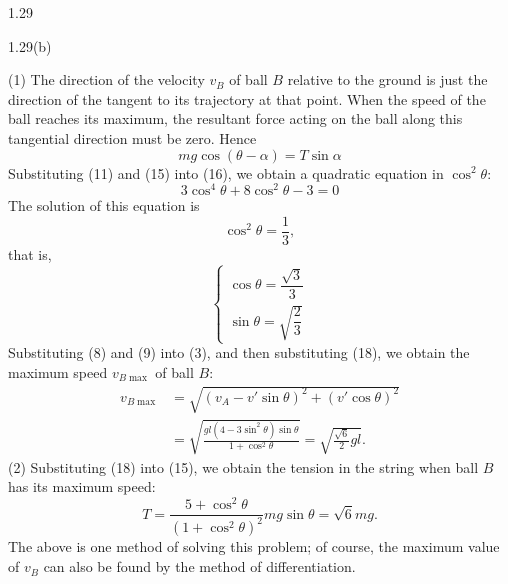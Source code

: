 \begin{solution}{1.29}
\begin{figbox}{1.29(b)}
\end{figbox}

(1) The direction of the velocity $v_B$ of ball $B$ relative to the ground is just the direction of the tangent to its trajectory at that point. When the speed of the ball reaches its maximum, the resultant force acting on the ball along this tangential direction must be zero. Hence
\begin{equation}
mg\cos(\theta-\alpha)=T\sin\alpha \tag{16}
\end{equation}
Substituting (11) and (15) into (16), we obtain a quadratic equation in $\cos^2\theta$:
\begin{equation}
3\cos^4\theta+8\cos^2\theta-3=0 \tag{17}
\end{equation}
The solution of this equation is
\[
\cos^2\theta=\frac{1}{3},
\]
that is,
\begin{equation}
\begin{cases}
\cos\theta=\dfrac{\sqrt{3}}{3}\\[2ex]
\sin\theta=\sqrt{\dfrac{2}{3}}
\end{cases} \tag{18}
\end{equation}
Substituting (8) and (9) into (3), and then substituting (18), we obtain the maximum speed $v_{B\max}$ of ball $B$:
\begin{align*}
v_{B\max}&=\sqrt{(v_A-v'\sin\theta)^2+(v'\cos\theta)^2}\\
&=\sqrt{\frac{gl(4-3\sin^2\theta)\sin\theta}{1+\cos^2\theta}}=\sqrt{\frac{\sqrt{6}}{2}gl}.
\end{align*}
(2) Substituting (18) into (15), we obtain the tension in the string when ball $B$ has its maximum speed:
\[
T=\frac{5+\cos^2\theta}{(1+\cos^2\theta)^2}mg\sin\theta=\sqrt{6}mg.
\]
The above is one method of solving this problem; of course, the maximum value of $v_B$ can also be found by the method of differentiation.

\end{solution}

